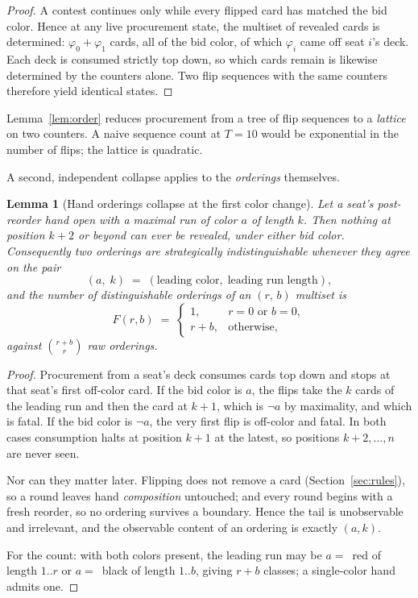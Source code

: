 \documentclass[11pt]{article}
\theoremstyle{plain}
\newtheorem{lemma}[theorem]{Lemma}
\theoremstyle{definition}
\theoremstyle{remark}
\begin{document}
\begin{proof}
A contest continues only while every flipped card has matched the bid
color. Hence at any live procurement state, the multiset of revealed cards
is determined: $\varphi_0+\varphi_1$ cards, all of the bid color, of which
$\varphi_i$ came off seat $i$'s deck. Each deck is consumed strictly top
down, so which cards remain is likewise determined by the counters alone.
Two flip sequences with the same counters therefore yield identical states.
\end{proof}

Lemma~\ref{lem:order} reduces procurement from a tree of flip sequences to
a \emph{lattice} on two counters. A naive sequence count at $T=10$ would be
exponential in the number of flips; the lattice is quadratic.

A second, independent collapse applies to the \emph{orderings} themselves.

\begin{lemma}[Hand orderings collapse at the first color change]
\label{lem:orderclass}
Let a seat's post-reorder hand open with a maximal run of color $a$ of
length $k$. Then nothing at position $k+2$ or beyond can ever be revealed,
under either bid color. Consequently two orderings are strategically
indistinguishable whenever they agree on the pair
\[
  (a,\;k)\;=\;(\text{leading color},\;\text{leading run length}),
\]
and the number of distinguishable orderings of an $(r,\,b)$ multiset is
\[
  F(r,b)\;=\;
  \begin{cases}
    1, & r=0 \text{ or } b=0,\\
    r+b, & \text{otherwise,}
  \end{cases}
\]
against $\binom{r+b}{r}$ raw orderings.
\end{lemma}

\begin{proof}
Procurement from a seat's deck consumes cards top down and stops at that
seat's first off-color card. If the bid color is $a$, the flips take the $k$
cards of the leading run and then the card at $k+1$, which is $\neg a$ by
maximality, and which is fatal. If the bid color is $\neg a$, the very first
flip is off-color and fatal. In both cases consumption halts at position
$k+1$ at the latest, so positions $k+2,\dots,n$ are never seen.

Nor can they matter later. Flipping does not remove a card
(Section~\ref{sec:rules}), so a round leaves hand \emph{composition}
untouched; and every round begins with a fresh reorder, so no ordering
survives a boundary. Hence the tail is unobservable and irrelevant, and the
observable content of an ordering is exactly $(a,k)$.

For the count: with both colors present, the leading run may be $a=$~red of
length $1..r$ or $a=$~black of length $1..b$, giving $r+b$ classes; a
single-color hand admits one.
\end{proof}
\end{document}
